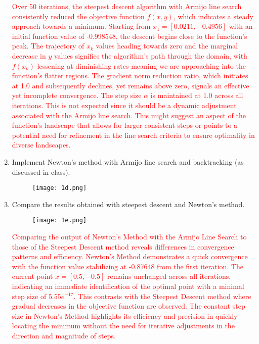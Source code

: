 \begin{enumerate}
\textcolor{red}{
Over 50 iterations, the steepest descent algorithm with Armijo line search consistently reduced the objective function \( f(x,y) \), which indicates a steady approach towards a minimum. Starting from \( x_1 = [0.0211, -0.4956] \) with an initial function value of -0.998548, the descent begins close to the function's peak. The trajectory of \( x_k \) values heading towards zero and the marginal decrease in \( y \) values signifies the algorithm's path through the domain, with \( f(x_k) \) lessening at diminishing rates meaning we are approaching into the function's flatter regions. The gradient norm reduction ratio, which initiates at 1.0 and subsequently declines, yet remains above zero, signals an effective yet incomplete convergence. The step size \( \alpha \) is maintained at 1.0 across all iterations. This is not expected since it should be a dynamic adjustment associated with the Armijo line search. This might suggest an aspect of the function's landscape that allows for larger consistent steps or points to a potential need for refinement in the line search criteria to ensure optimality in diverse landscapes.
}




\item Implement Newton's method with Armijo line search and
  backtracking (as discussed in class).  


    \begin{figure}[H]
    \centering
    \texttt{[image: 1d.png]} 
    \end{figure}

  
\item Compare the results obtained with steepest descent and Newton's
  method.
  \een


    \begin{figure}[H]
    \centering
    \texttt{[image: 1e.png]} 
    \end{figure}


\textcolor{red}{
Comparing the output of Newton's Method with the Armijo Line Search to those of the Steepest Descent method reveals differences in convergence patterns and efficiency. Newton's Method demonstrates a quick convergence with the function value stabilizing at -0.87648 from the first iteration. The current point \(x = [0.5, -0.5]\) remains unchanged across all iterations, indicating an immediate identification of the optimal point with a minimal step size of \(5.55e^{-17}\). This contrasts with the Steepest Descent method where gradual decreases in the objective function are observed. The constant step size in Newton's Method highlights its efficiency and precision in quickly locating the minimum without the need for iterative adjustments in the direction and magnitude of steps.
}








\end{enumerate}
